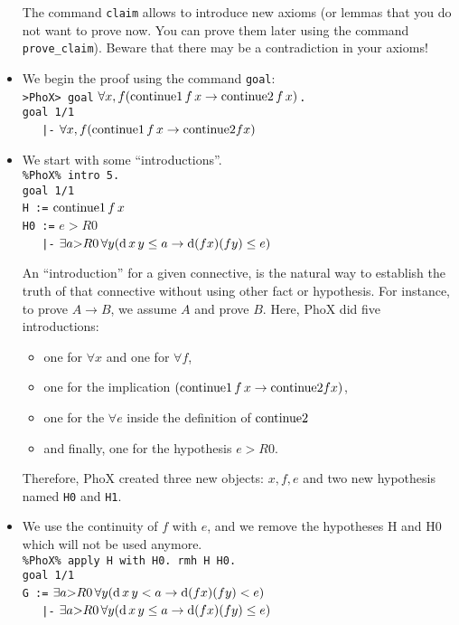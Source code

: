 \begin{itemize}
The command \verb~claim~ allows to introduce new axioms (or lemmas that
you do not want to prove now. You can prove them later using the
command \verb~prove_claim~). Beware that there may be a contradiction
in your axioms!

\item We begin the proof using the command \verb~goal~: \\
\verb~>PhoX> goal~ $\forall x,f (\hbox{continue1} \, f \, x \rightarrow \hbox{continue2} \, f \, x)$\verb~.~\\
\verb~goal 1/1~\\
\verb~   |-~ $\forall x,f (\hbox{continue1} \, f \, x \rightarrow
\hbox{continue2} f x)$

\item We start with some ``introductions''.\\
\verb~%PhoX% intro 5.~\\
\verb~goal 1/1~\\
\verb~H :=~ $\hbox{continue1} \, f \, x$\\
\verb~H0 :=~ $e > R0$\\
\verb~   |-~ $\exists a{>}R0  \,\forall y (\hbox{d}\,x\,y \leq a \to \hbox{d} (f x) (f y) \leq e)$

An ``introduction'' for a given connective, is the natural way to
establish the truth of that connective without using other fact
or hypothesis. For instance, to prove $A \to B$, we assume $A$ and
prove $B$. Here, PhoX did five introductions:
\begin{itemize}
\item one for $\forall x$ and one for $\forall f$,
\item one for the implication $(\hbox{continue1} \, f \, x \rightarrow
\hbox{continue2} f x)$,
\item one for the $\forall e$ inside the definition
of $\hbox{continue2}$
\item and finally, one for the hypothesis $e > R0$.
\end{itemize}

Therefore, PhoX created three new objects: $x,f,e$ and two new
hypothesis named \verb~H0~ and \verb~H1~.

\item We use the continuity of $f$ with $e$, and we remove the  hypotheses
H and H0 which will not be used anymore.\\
\verb~%PhoX% apply H with H0. rmh H H0.~\\
\verb~goal 1/1~\\
\verb~G :=~ $\exists a{>}R0 \,\forall y (\hbox{d}\,x\,y < a \to \hbox{d} (f x) (f y) < e)$\\
\verb~   |-~ $\exists a{>}R0 \,\forall y (\hbox{d}\,x\,y \leq a \to \hbox{d} (f x) (f y) \leq e)$


\end{itemize}
